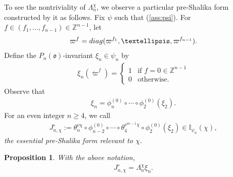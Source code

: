 \documentclass[11pt]{amsart}
\newcommand\Lam{\Lambda}
\newcommand\Vp{\varpi}%
\newcommand\vp{\varphi}%
\newcommand\oo{\mathfrak{o}}
\newcommand\Z{{\mathbb{Z}}}
\newcommand\Ib{{\mathbb{I}}}
\newcommand\1{\mathbf{1}}
\newcommand\diag{{\rm diag}}
\newcommand\ac{\acute}
\numberwithin{equation}{section}
\newtheorem{prop}[thm]{Proposition}
\begin{document}
To see the nontriviality of $\Lam_n^\chi$, we observe a particular pre-Shalika form constructed by it as follows.
Fix $\psi$ such that (\ref{ass:psi}).
For $f \in (f_1, \ldots, f_{n-1}) \in \Z^{n-1}$, let 
\begin{align*}
\Vp^f = \diag(\Vp^{f_1}, \ldots, \Vp^{f_{n-1}}).
\end{align*}
Define the $P_n(\oo)$-invariant $\xi_n \in \psi_n$ by
\begin{align}
\xi_n(\ac{\Vp}^f) = 
\begin{cases}
1 & \mbox{if $f = 0 \in \Z^{n-1}$} \\
0 & \mbox{otherwise.} 
\end{cases} \label{def:xin}
\end{align} 
Observe that 
\begin{align*}
\xi_n = \phi_{n}^{(0)} \circ \cdots \circ \phi_2^{(0)}(\xi_2).
\end{align*} 
For an even integer $n \ge 4$, we call  
\begin{align}
J_{n,\chi}^\circ := \theta_n^{\nu \chi} \circ \phi_{n-2}^{(0)} \circ \cdots \circ \theta_4^{\nu^{m-1} \chi} \circ \phi_2^{(0)}(\xi_2) \in \Ib_{\psi_n}(\chi), \label{def:Theta}
\end{align} 
 {\it the essential pre-Shalika form relevant to $\chi$}.
 \begin{prop}\label{prop:Presheq}
With the above notation, 
\begin{align*}
 J_{n,\chi}^\circ = \Lam_n^\chi \xi_n.
 \end{align*} 
\end{prop}
\end{document}
